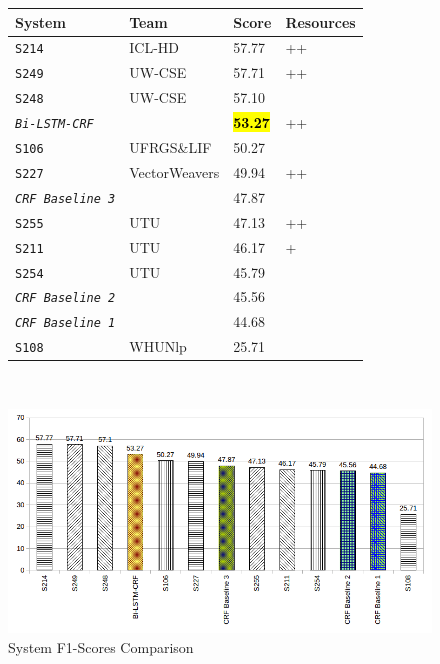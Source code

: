 \begin{figure}[H]
  \begin{minipage}{\textwidth}
    \centering
    \begin{tabular}{|l|l|l|l|}
      \hline
      \textbf{System} & \textbf{Team}  & \textbf{Score} & \textbf{Resources}\\
      \hline
      \hline
      \texttt{S214} & ICL-HD & 57.77 & ++ \\
      \hline
      \texttt{S249} & UW-CSE & 57.71 & ++ \\
      \hline
      \texttt{S248} & UW-CSE & 57.10 &    \\
      \hline
      \texttt{\it Bi-LSTM-CRF} & & \hl{\bf 53.27} & ++ \\
      \hline
      \texttt{S106} & UFRGS\&LIF & 50.27 &   \\
      \hline
      \texttt{S227} & VectorWeavers & 49.94 & ++ \\
      \hline
      \texttt{\it CRF Baseline 3} & &  47.87 &   \\
      \hline
      \texttt{S255} & UTU & 47.13 & ++ \\
      \hline
      \texttt{S211} & UTU & 46.17 & + \\
      \hline
      \texttt{S254} & UTU & 45.79 &   \\
      \hline
      \texttt{\it CRF Baseline 2} & & 45.56 &   \\
      \hline
      \texttt{\it CRF Baseline 1} & & 44.68 &   \\
      \hline
      \texttt{S108} & WHUNlp & 25.71 &   \\
      \hline
    \end{tabular}
  \end{minipage}\\
  \begin{minipage}{\textwidth}
    \includegraphics[width=\textwidth]{images/systems_comparison_bar_graph.png}
  \end{minipage}
  \caption{System F1-Scores Comparison}
  \label{fig:systemsf1scorescomparison}
\end{figure}

